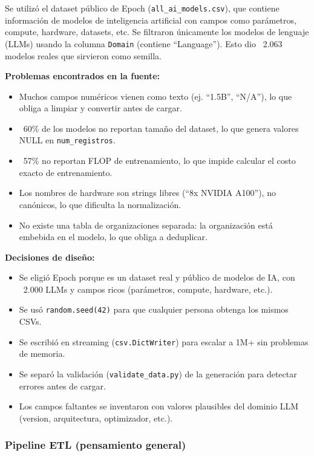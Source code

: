 \documentclass[12pt,a4paper]{article}
\begin{document}
Se utilizó el dataset público de Epoch (\texttt{all\_ai\_models.csv}), que contiene información de modelos de inteligencia artificial con campos como parámetros, compute, hardware, datasets, etc. Se filtraron únicamente los modelos de lenguaje (LLMs) usando la columna \texttt{Domain} (contiene ``Language''). Esto dio ~2.063 modelos reales que sirvieron como semilla.

\textbf{Problemas encontrados en la fuente:}
\begin{itemize}
  \item Muchos campos numéricos vienen como texto (ej. ``1.5B'', ``N/A''), lo que obliga a limpiar y convertir antes de cargar.
  \item ~60\% de los modelos no reportan tamaño del dataset, lo que genera valores NULL en \texttt{num\_registros}.
  \item ~57\% no reportan FLOP de entrenamiento, lo que impide calcular el costo exacto de entrenamiento.
  \item Los nombres de hardware son strings libres (``8x NVIDIA A100''), no canónicos, lo que dificulta la normalización.
  \item No existe una tabla de organizaciones separada: la organización está embebida en el modelo, lo que obliga a deduplicar.
\end{itemize}

\textbf{Decisiones de diseño:}
\begin{itemize}
  \item Se eligió Epoch porque es un dataset real y público de modelos de IA, con ~2.000 LLMs y campos ricos (parámetros, compute, hardware, etc.).
  \item Se usó \texttt{random.seed(42)} para que cualquier persona obtenga los mismos CSVs.
  \item Se escribió en streaming (\texttt{csv.DictWriter}) para escalar a 1M+ sin problemas de memoria.
  \item Se separó la validación (\texttt{validate\_data.py}) de la generación para detectar errores antes de cargar.
  \item Los campos faltantes se inventaron con valores plausibles del dominio LLM (version, arquitectura, optimizador, etc.).
\end{itemize}

\subsubsection{Pipeline ETL (pensamiento general)}
\end{document}
